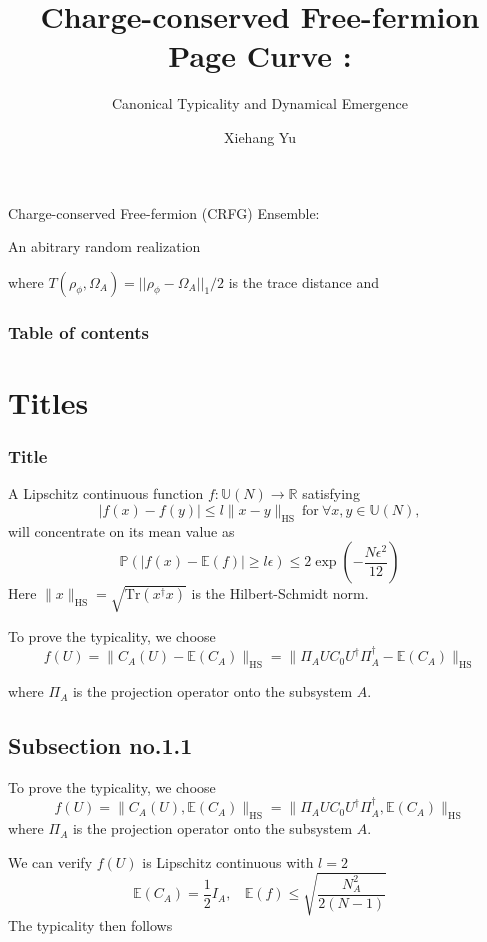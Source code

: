 \documentclass{beamer}
\title{Charge-conserved Free-fermion Page Curve :}
\author{Xiehang Yu}
\institute
{
  Quantum Science and Technology (from 10.2021)\\
}
\subtitle{Canonical Typicality and Dynamical Emergence}
\begin{document}
\begin{frame}
	Charge-conserved Free-fermion (CRFG) Ensemble:

 
        An abitrary random realization 

        
        where $T(\rho_{\phi},\Omega_{A})=||\rho_{\phi}-\Omega_{A}||_{1}/2$ is the trace distance and
\end{frame}

\begin{frame}
   \frametitle{Table of contents}
   \tableofcontents[subsectionstyle=hide]
\end{frame} 

\section{Titles} 
\begin{frame}
   \frametitle{Title} 
A Lipschitz continuous function $f:\mathbb{U}(N)\to\mathbb{R}$ satisfying
\[
|f(x)-f(y)|\leq l \|x-y\|_{\mathrm{HS}}\ \mathrm{for}\ \forall x,y\in\mathbb{U}(N),
\]
will concentrate on its mean value as
\[
\mathbb{P}(|f(x)-\mathbb{E}(f)|\geq l \epsilon) \leq 2\exp\left(-\frac{N\epsilon^2}{12}\right)
\]
Here $\|x\|_\mathrm{HS}=\sqrt{\mathrm{Tr}(x^{\dagger}x)}$ is the Hilbert-Schmidt norm.
\begin{center}
To prove the typicality, we choose
\[f(U)=\|C_{A}(U)-\mathbb{E}(C_{A})\|_{\mathrm{HS}}=\|\Pi_{A}UC_{0}U^{\dagger}\Pi_{A}^{\dagger}-\mathbb{E}(C_{A})\|_{\mathrm{HS}}\]
\end{center}
where $\Pi_{A}$ is the projection operator onto the subsystem $A$. 

\end{frame}



\subsection{Subsection no.1.1  }
\begin{frame} 
   To prove the typicality, we choose
\[f(U)=\|C_{A}(U),\mathbb{E}(C_{A})\|_{\mathrm{HS}}=\|\Pi_{A}UC_{0}U^{\dagger}\Pi_{A}^{\dagger},\mathbb{E}(C_{A})\|_{\mathrm{HS}}\]
where $\Pi_{A}$ is the projection operator onto the subsystem $A$. 


We can verify $f(U)$ is Lipschitz continuous with $l=2$ 
\[
   \mathbb{E}(C_{A})=\frac{1}{2}I_{A},\ \ \ \ \mathbb{E}(f)\leq\sqrt{\frac{N_{A}^{2}}{2(N-1)}} 
   \]
The typicality then follows
\end{frame}
\end{document}
